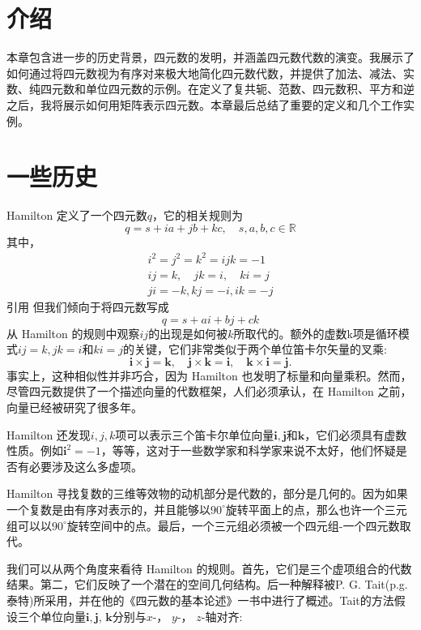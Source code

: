 
\section{介绍}
本章包含进一步的历史背景，四元数的发明，并涵盖四元数代数的演变。我展示了如何通过将四元数视为有序对来极大地简化四元数代数，并提供了加法、减法、实数、纯四元数和单位四元数的示例。在定义了复共轭、范数、四元数积、平方和逆之后，我将展示如何用矩阵表示四元数。本章最后总结了重要的定义和几个工作实例。



\section{一些历史}
Hamilton 定义了一个四元数$q$，它的相关规则为
$$
    q=s+i a+j b+k c, \quad s, a, b, c \in \mathbb{R}
$$
其中，
$$
    \begin{gathered}
        i^{2}=j^{2}=k^{2}=i j k=-1 \\
        i j=k, \quad j k=i, \quad k i=j \\
        j i=-k, k j=-i, i k=-j
    \end{gathered}
$$
引用\cite{bib6-1,bib6-2,bib6-3} 但我们倾向于将四元数写成
$$
    q=s+a i+b j+c k
$$
从 Hamilton 的规则中观察$i  j$的出现是如何被$k$所取代的。额外的虚数k项是循环模式$i j=k, j k=i$和$k i=j$的关键，它们非常类似于两个单位笛卡尔矢量的叉乘:
$$
    \mathbf{i} \times \mathbf{j}=\mathbf{k}, \quad \mathbf{j} \times \mathbf{k}=\mathbf{i}, \quad \mathbf{k} \times \mathbf{i}=\mathbf{j} .
$$
事实上，这种相似性并非巧合，因为 Hamilton 也发明了标量和向量乘积。然而，尽管四元数提供了一个描述向量的代数框架，人们必须承认，在 Hamilton 之前，向量已经被研究了很多年。

Hamilton 还发现$i, j, k$项可以表示三个笛卡尔单位向量$\mathbf{i}, \mathbf{j}$和$\mathbf{k}$，它们必须具有虚数性质。例如$\mathbf{i}^{2}=-1$，等等，这对于一些数学家和科学家来说不太好，他们怀疑是否有必要涉及这么多虚项。

Hamilton 寻找复数的三维等效物的动机部分是代数的，部分是几何的。因为如果一个复数是由有序对表示的，并且能够以$90^{\circ}$旋转平面上的点，那么也许一个三元组可以以$90^{\circ}$旋转空间中的点。最后，一个三元组必须被一个四元组-一个四元数取代。

我们可以从两个角度来看待 Hamilton 的规则。首先，它们是三个虚项组合的代数结果。第二，它们反映了一个潜在的空间几何结构。后一种解释被P. G. Tait(p.g.泰特)所采用，并在他的《四元数的基本论述》一书中进行了概述。Tait的方法假设三个单位向量$\mathbf{i}, \mathbf{j}$, $\mathbf{k}$分别与$x$-， $y$-， $z$-轴对齐:

